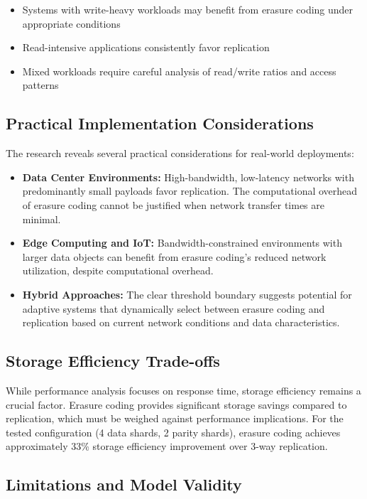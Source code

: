 \begin{itemize}
\item Systems with write-heavy workloads may benefit from erasure coding under appropriate conditions
\item Read-intensive applications consistently favor replication
\item Mixed workloads require careful analysis of read/write ratios and access patterns
\end{itemize}

\subsection{Practical Implementation Considerations}

The research reveals several practical considerations for real-world deployments:

\begin{itemize}
\item \textbf{Data Center Environments:} High-bandwidth, low-latency networks with predominantly small payloads favor replication. The computational overhead of erasure coding cannot be justified when network transfer times are minimal.
\item \textbf{Edge Computing and IoT:} Bandwidth-constrained environments with larger data objects can benefit from erasure coding's reduced network utilization, despite computational overhead.
\item \textbf{Hybrid Approaches:} The clear threshold boundary suggests potential for adaptive systems that dynamically select between erasure coding and replication based on current network conditions and data characteristics.
\end{itemize}

\subsection{Storage Efficiency Trade-offs}

While performance analysis focuses on response time, storage efficiency remains a crucial factor. Erasure coding provides significant storage savings compared to replication, which must be weighed against performance implications. For the tested configuration (4 data shards, 2 parity shards), erasure coding achieves approximately 33\% storage efficiency improvement over 3-way replication.

\subsection{Limitations and Model Validity}

